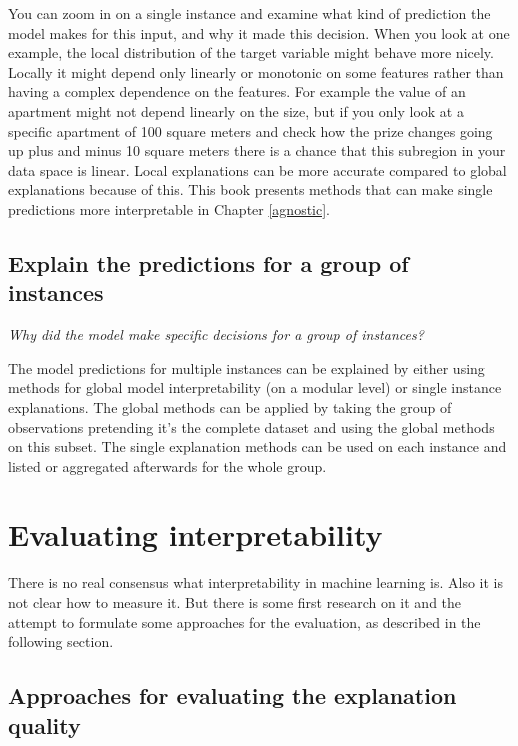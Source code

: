 \documentclass[12pt,]{krantz}
\theoremstyle{definition}
\theoremstyle{definition}
\theoremstyle{definition}
\theoremstyle{remark}
\begin{document}
You can zoom in on a single instance and examine what kind of prediction
the model makes for this input, and why it made this decision. When you
look at one example, the local distribution of the target variable might
behave more nicely. Locally it might depend only linearly or monotonic
on some features rather than having a complex dependence on the
features. For example the value of an apartment might not depend
linearly on the size, but if you only look at a specific apartment of
100 square meters and check how the prize changes going up plus and
minus 10 square meters there is a chance that this subregion in your
data space is linear. Local explanations can be more accurate compared
to global explanations because of this. This book presents methods that
can make single predictions more interpretable in Chapter
\ref{agnostic}.

\subsection{Explain the predictions for a group of
instances}\label{explain-the-predictions-for-a-group-of-instances}

\emph{Why did the model make specific decisions for a group of
instances?}

The model predictions for multiple instances can be explained by either
using methods for global model interpretability (on a modular level) or
single instance explanations. The global methods can be applied by
taking the group of observations pretending it's the complete dataset
and using the global methods on this subset. The single explanation
methods can be used on each instance and listed or aggregated afterwards
for the whole group.

\section{Evaluating interpretability}\label{evaluating-interpretability}

There is no real consensus what interpretability in machine learning is.
Also it is not clear how to measure it. But there is some first research
on it and the attempt to formulate some approaches for the evaluation,
as described in the following section.

\subsection{Approaches for evaluating the explanation
quality}\label{approaches-for-evaluating-the-explanation-quality}
\end{document}
